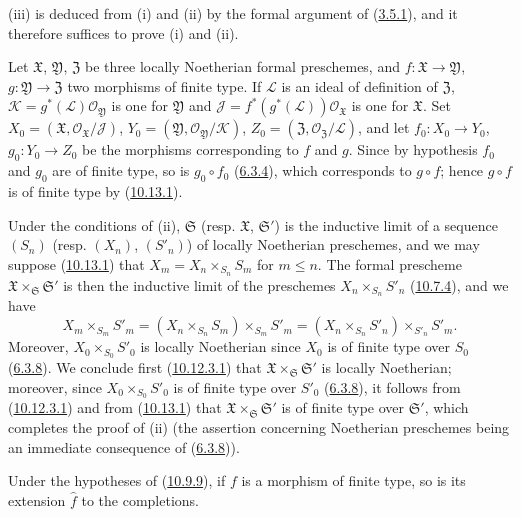 (iii) is deduced from (i) and (ii) by the formal argument of
(\hyperref[I.3.5.1]{3.5.1}), and it therefore suffices to prove (i) and (ii).

Let $\mathfrak{X}$, $\mathfrak{Y}$, $\mathfrak{Z}$ be three locally
Noetherian formal preschemes, and $f:\mathfrak{X}\to\mathfrak{Y}$,
$g:\mathfrak{Y}\to\mathfrak{Z}$ two morphisms of finite type. If
$\mathscr{L}$ is an ideal of definition of $\mathfrak{Z}$,
$\mathscr{K}=g^*(\mathscr{L})\mathscr{O}_{\mathfrak{Y}}$ is one for
$\mathfrak{Y}$ and
$\mathscr{J}=f^*(g^*(\mathscr{L}))\mathscr{O}_{\mathfrak{X}}$ is one
for $\mathfrak{X}$. Set
$X_0=(\mathfrak{X},\mathscr{O}_{\mathfrak{X}}/\mathscr{J})$,
$Y_0=(\mathfrak{Y},\mathscr{O}_{\mathfrak{Y}}/\mathscr{K})$,
$Z_0=(\mathfrak{Z},\mathscr{O}_{\mathfrak{Z}}/\mathscr{L})$, and let
$f_0:X_0\to Y_0$, $g_0:Y_0\to Z_0$ be the morphisms corresponding to $f$ and
$g$. Since by hypothesis $f_0$ and $g_0$ are of finite type, so is
$g_0\circ f_0$ (\hyperref[I.6.3.4]{6.3.4}), which corresponds to
$g\circ f$; hence $g\circ f$ is of finite type by
(\hyperref[I.10.13.1]{10.13.1}).

Under the conditions of (ii), $\mathfrak{S}$ (resp. $\mathfrak{X}$,
$\mathfrak{S}'$) is the inductive limit of a sequence $(S_n)$ (resp. $(X_n)$,
$(S'_n)$) of locally Noetherian preschemes, and we may suppose
(\hyperref[I.10.13.1]{10.13.1}) that
$X_m=X_n\times_{S_n}S_m$ for $m\leq n$. The formal prescheme
$\mathfrak{X}\times_{\mathfrak{S}}\mathfrak{S}'$ is then the inductive limit
of the preschemes $X_n\times_{S_n}S'_n$
(\hyperref[I.10.7.4]{10.7.4}), and we have
\[
  X_m\times_{S_m}S'_m
  =(X_n\times_{S_n}S_m)\times_{S_m}S'_m
  =(X_n\times_{S_n}S'_n)\times_{S'_n}S'_m.
\]
Moreover, $X_0\times_{S_0}S'_0$ is locally Noetherian since $X_0$
is of finite type over $S_0$ (\hyperref[I.6.3.8]{6.3.8}). We conclude
first (\hyperref[I.10.12.3.1]{10.12.3.1}) that
$\mathfrak{X}\times_{\mathfrak{S}}\mathfrak{S}'$ is locally
Noetherian; moreover, since $X_0\times_{S_0}S'_0$ is of finite type over
$S'_0$ (\hyperref[I.6.3.8]{6.3.8}), it follows from
(\hyperref[I.10.12.3.1]{10.12.3.1}) and from
(\hyperref[I.10.13.1]{10.13.1}) that
$\mathfrak{X}\times_{\mathfrak{S}}\mathfrak{S}'$ is of finite type over
$\mathfrak{S}'$, which completes the proof of (ii) (the assertion concerning
Noetherian preschemes being an immediate consequence of
(\hyperref[I.6.3.8]{6.3.8})).

\begin{corollary}[10.13.6]
\label{I.10.13.6}
Under the hypotheses of (\hyperref[I.10.9.9]{10.9.9}), if $f$ is a
morphism of finite type, so is its extension $\widehat f$
to the completions.
\end{corollary}

